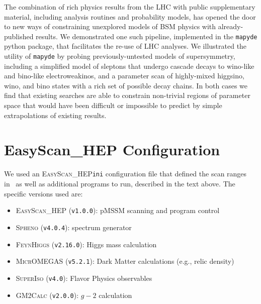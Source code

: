 \documentclass{article}
\newcommand{\mapyde}{\texttt{mapyde}}
\newcommand{\easyscanhep}{\textsc{EasyScan\_HEP}}
\newcommand{\spheno}{\textsc{Spheno}}
\newcommand{\feynhiggs}{\textsc{FeynHiggs}}
\newcommand{\micromegas}{\textsc{MicrOMEGAS}}
\newcommand{\superiso}{\textsc{SuperIso}}
\newcommand{\gmtwocalc}{\textsc{GM2Calc}}
\begin{document}
The combination of rich physics results from the LHC with public supplementary material, including analysis routines and probability models, has opened the door to new ways of constraining unexplored models of BSM physics with already-published results.  We demonstrated one such pipeline, implemented in the \mapyde{} python package, that facilitates the re-use of LHC analyses.  We illustrated the utility of \mapyde{} by probing previously-untested models of supersymmetry, including a simplified model of sleptons that undergo cascade decays to wino-like and bino-like electroweakinos, and a parameter scan of highly-mixed higgsino, wino, and bino states with a rich set of possible decay chains.  In both cases we find that existing searches are able to constrain non-trivial regions of parameter space that would have been difficult or impossible to predict by simple extrapolations of existing results.

\printbibliography

\appendix

\section{EasyScan\_HEP Configuration}
\label{sec:easyscan-hep-configuration}

We used an \easyscanhep \texttt{ini} configuration file that defined the scan ranges in~ as well as additional programs to run, described in the text above. The specific versions used are:

\begin{itemize}
	\item \easyscanhep{} (\texttt{v1.0.0}): pMSSM scanning and program control~\cite{easyscanhep,Han:2016gvr}
	\item \spheno{} (\texttt{v4.0.4}): spectrum generator~\cite{Porod:2003um,Porod:2011nf}
	\item \feynhiggs{} (\texttt{v2.16.0}): Higgs mass calculation~\cite{Bahl:2018qog,Bahl:2017aev,Bahl:2016brp,Hahn:2013ria,Frank:2006yh,Degrassi:2002fi,Heinemeyer:1998np,Heinemeyer:1998yj}
	\item \micromegas{} (\texttt{v5.2.1}): Dark Matter calculations (e.g., relic density)~\cite{Belanger:2020gnr}
	\item \superiso{} (\texttt{v4.0}): Flavor Physics observables~\cite{Arbey:2018msw}
	\item \gmtwocalc{} (\texttt{v2.0.0}): $g-2$ calculation~\cite{Athron:2015rva,Athron:2021evk}
\end{itemize}
\end{document}
